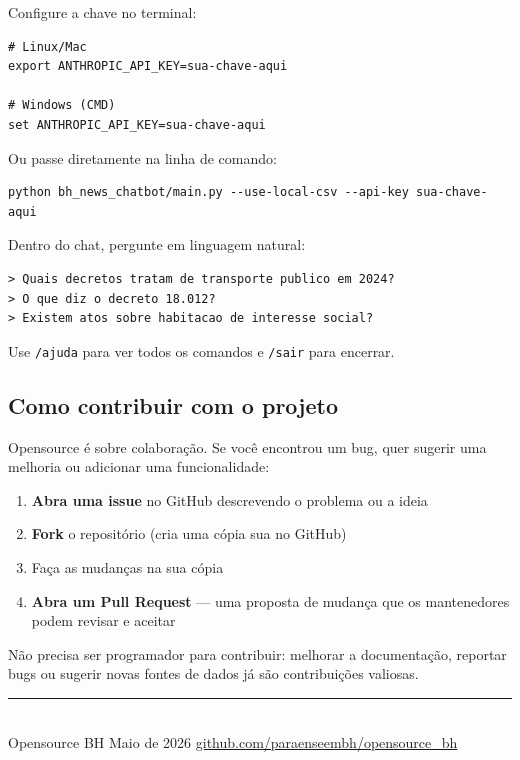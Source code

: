 \documentclass[12pt,a4paper]{article}
\begin{document}
Configure a chave no terminal:

\begin{lstlisting}
# Linux/Mac
export ANTHROPIC_API_KEY=sua-chave-aqui

# Windows (CMD)
set ANTHROPIC_API_KEY=sua-chave-aqui
\end{lstlisting}

Ou passe diretamente na linha de comando:

\begin{lstlisting}
python bh_news_chatbot/main.py --use-local-csv --api-key sua-chave-aqui
\end{lstlisting}

Dentro do chat, pergunte em linguagem natural:

\begin{lstlisting}
> Quais decretos tratam de transporte publico em 2024?
> O que diz o decreto 18.012?
> Existem atos sobre habitacao de interesse social?
\end{lstlisting}

Use \texttt{/ajuda} para ver todos os comandos e \texttt{/sair} para encerrar.

\subsection{Como contribuir com o projeto}

Opensource é sobre colaboração. Se você encontrou um bug, quer sugerir uma melhoria ou adicionar uma funcionalidade:

\begin{enumerate}
  \item \textbf{Abra uma issue} no GitHub descrevendo o problema ou a ideia
  \item \textbf{Fork} o repositório (cria uma cópia sua no GitHub)
  \item Faça as mudanças na sua cópia
  \item \textbf{Abra um Pull Request} --- uma proposta de mudança que os mantenedores podem revisar e aceitar
\end{enumerate}

Não precisa ser programador para contribuir: melhorar a documentação, reportar bugs ou sugerir novas fontes de dados já são contribuições valiosas.

\vfill
\begin{center}
  \small\color{bhgray}
  \rule{0.4\linewidth}{0.4pt}\\[4pt]
  Opensource BH \textbullet{} Maio de 2026 \textbullet{}
  \href{https://github.com/paraenseembh/opensource_bh}{github.com/paraenseembh/opensource\_bh}
\end{center}
\end{document}

